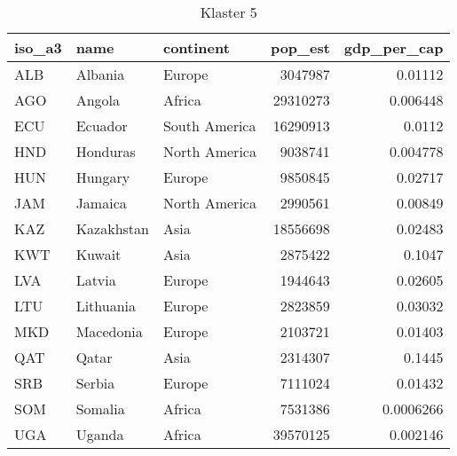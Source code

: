 \begin{table}[h!]
   \centering
   \caption{Klaster 5}
   \label{tab:cl5}
   \begin{tabular}{lllrr}
      \toprule
      iso\_a3 & name       & continent     & pop\_est & gdp\_per\_cap \\
      \midrule
      ALB     & Albania    & Europe        & 3047987  & 0.01112       \\
      AGO     & Angola     & Africa        & 29310273 & 0.006448      \\
      ECU     & Ecuador    & South America & 16290913 & 0.0112        \\
      HND     & Honduras   & North America & 9038741  & 0.004778      \\
      HUN     & Hungary    & Europe        & 9850845  & 0.02717       \\
      JAM     & Jamaica    & North America & 2990561  & 0.00849       \\
      KAZ     & Kazakhstan & Asia          & 18556698 & 0.02483       \\
      KWT     & Kuwait     & Asia          & 2875422  & 0.1047        \\
      LVA     & Latvia     & Europe        & 1944643  & 0.02605       \\
      LTU     & Lithuania  & Europe        & 2823859  & 0.03032       \\
      MKD     & Macedonia  & Europe        & 2103721  & 0.01403       \\
      QAT     & Qatar      & Asia          & 2314307  & 0.1445        \\
      SRB     & Serbia     & Europe        & 7111024  & 0.01432       \\
      SOM     & Somalia    & Africa        & 7531386  & 0.0006266     \\
      UGA     & Uganda     & Africa        & 39570125 & 0.002146      \\
      \bottomrule
   \end{tabular}
\end{table}
